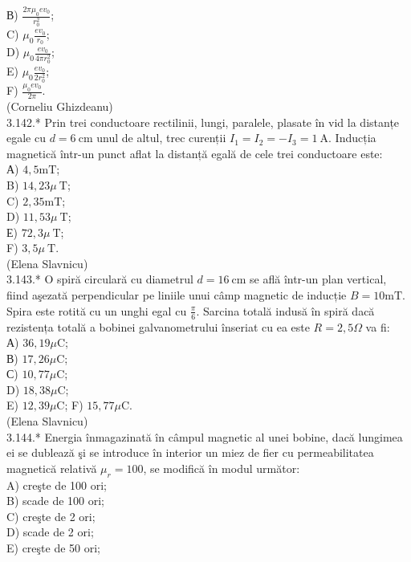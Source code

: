\documentclass[10pt]{article}
\begin{document}
В) $\frac{2 \pi \mu_{0} e v_{0}}{r_{0}^{2}}$;\\
C) $\mu_{0} \frac{e v_{0}}{r_{0}}$;\\
D) $\mu_{0} \frac{e v_{0}}{4 \pi r_{0}^{2}}$;\\
E) $\mu_{0} \frac{e v_{0}}{2 r_{0}^{2}}$;\\
F) $\frac{\mu_{0} e v_{0}}{2 \pi}$.\\
(Corneliu Ghizdeanu)\\
3.142.* Prin trei conductoare rectilinii, lungi, paralele, plasate în vid la distanțe egale cu $d=6 \mathrm{~cm}$ unul de altul, trec curenții $I_{1}=I_{2}=-I_{3}=1 \mathrm{~A}$. Inducția magnetică într-un punct aflat la distanță egală de cele trei conductoare este:\\
А) $4,5 \mathrm{mT}$;\\
B) $14,23 \mu \mathrm{~T}$;\\
C) $2,35 \mathrm{mT}$;\\
D) $11,53 \mu \mathrm{~T}$;\\
Е) $72,3 \mu \mathrm{~T}$;\\
F) $3,5 \mu \mathrm{~T}$.\\
(Elena Slavnicu)\\
3.143.* O spiră circulară cu diametrul $d=16 \mathrm{~cm}$ se află într-un plan vertical, fiind aşezată perpendicular pe liniile unui câmp magnetic de inducție $B=10 \mathrm{mT}$. Spira este rotită cu un unghi egal cu $\frac{\pi}{6}$. Sarcina totală indusă în spiră dacă rezistența totală a bobinei galvanometrului înseriat cu ea este $R=2,5 \Omega$ va fi:\\
А) $36,19 \mu \mathrm{C}$;\\
В) $17,26 \mu \mathrm{C}$;\\
С) $10,77 \mu \mathrm{C}$;\\
D) $18,38 \mu \mathrm{C}$;\\
E) $12,39 \mu \mathrm{C}$; F) $15,77 \mu \mathrm{C}$.\\
(Elena Slavnicu)\\
3.144.* Energia înmagazinată în câmpul magnetic al unei bobine, dacă lungimea ei se dublează şi se introduce în interior un miez de fier cu permeabilitatea magnetică relativă $\mu_{r}=100$, se modifică în modul următor:\\
A) creşte de 100 ori;\\
B) scade de 100 ori;\\
C) creşte de 2 ori;\\
D) scade de 2 ori;\\
E) creşte de 50 ori;\\
\end{document}
